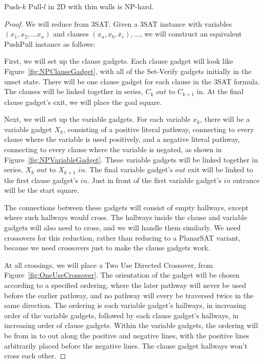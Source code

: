 \begin{theorem}
\label{thm:2DNPhard}
Push-$k$ Pull-$l$ in 2D with thin walls is NP-hard.
\end{theorem}
\begin{proof}
    We will reduce from 3SAT. Given a 3SAT instance with variables $(x_1, x_2, \ldots x_n)$ and clauses $(x_a, x_b, \overline x_c), \ldots$, we will construct an equivalent PushPull instance as follows: 

    First, we will set up the clause gadgets. Each clause gadget will look like Figure~\ref{fig:NPClauseGadget}, with all of the Set-Verify gadgets initially in the unset state. There will be one clause gadget for each clause in the 3SAT formula. The clauses will be linked together in series, $C_k$ $out$ to $C_{k+1}$ in. At the final clause gadget's exit, we will place the goal square.

    Next, we will set up the variable gadgets. For each variable $x_k$, there will be a variable gadget $X_k$, consisting of a positive literal pathway, connecting to every clause where the variable is used positively, and a negative literal pathway, connecting to every clause where the variable is negated, as shown in Figure~\ref{fig:NPVariableGadget}. These variable gadgets will be linked together in series, $X_k$ $out$ to $X_{k+1}$ $in$. The final variable gadget's $out$ exit will be linked to the first clause gadget's $in$. Just in front of the first variable gadget's $in$ entrance will be the start square.

    The connections between these gadgets will consist of empty hallways, except where such hallways would cross. The hallways inside the clause and variable gadgets will also need to cross, and we will handle them similarly. We need crossovers for this reduction, rather than reducing to a PlanarSAT variant, because we need crossovers just to make the clause gadgets work.
    
    At all crossings, we will place a Two Use Directed Crossover, from Figure~\ref{fig:OneUseCrossover}. The orientation of the gadget will be chosen according to a specified ordering, where the later pathway will never be used before the earlier pathway, and no pathway will every be traversed twice in the same direction. The ordering is each variable gadget's hallways, in increasing order of the variable gadgets, followed by each clause gadget's hallways, in increasing order of clause gadgets. Within the variable gadgets, the ordering will be from in to out along the positive and negative lines, with the positive lines arbitrarily placed before the negative lines. The clause gadget hallways won't cross each other.


\end{proof}
